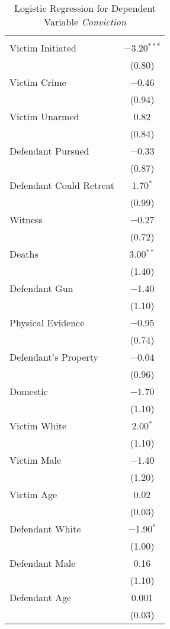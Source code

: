 \documentclass[11pt, oneside]{article}   	%
\begin{document}
\singlespacing

\begin{table}[!htbp] \centering 
  \caption{Logistic Regression for Dependent Variable \emph{Conviction}} 
  \label{} 
\footnotesize 
\begin{tabular}{@{\extracolsep{0pt}}lc} 
\\[-1.8ex]\hline \\[-1.8ex] 
\hline \\[-1.8ex] 
 Victim Initiated & $-$3.20$^{***}$ \\ 
  & (0.80) \\ 
  Victim Crime & $-$0.46 \\ 
  & (0.94) \\ 
  Victim Unarmed & 0.82 \\ 
  & (0.84) \\ 
  Defendant Pursued & $-$0.33 \\ 
  & (0.87) \\ 
  Defendant Could Retreat & 1.70$^{*}$ \\ 
  & (0.99) \\ 
  Witness & $-$0.27 \\ 
  & (0.72) \\ 
  Deaths & 3.00$^{**}$ \\ 
  & (1.40) \\ 
  Defendant Gun & $-$1.40 \\ 
  & (1.10) \\ 
  Physical Evidence & $-$0.95 \\ 
  & (0.74) \\ 
  Defendant's Property & $-$0.04 \\ 
  & (0.96) \\ 
  Domestic & $-$1.70 \\ 
  & (1.10) \\ 
  Victim White & 2.00$^{*}$ \\ 
  & (1.10) \\ 
  Victim Male & $-$1.40 \\ 
  & (1.20) \\ 
  Victim Age & 0.02 \\ 
  & (0.03) \\ 
  Defendant White & $-$1.90$^{*}$ \\ 
  & (1.00) \\ 
  Defendant Male & 0.16 \\ 
  & (1.10) \\ 
  Defendant Age & 0.001 \\ 
  & (0.03) \\ 

\end{tabular}
\end{table}
\end{document}
